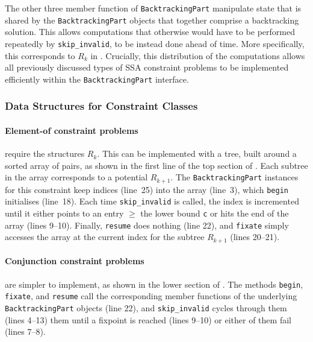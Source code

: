     The other three member function of \texttt{BacktrackingPart} manipulate
    state that is shared by the \texttt{BacktrackingPart} objects
    that together comprise a backtracking solution.
    This allows computations that otherwise would have to be performed
    repeatedly by \texttt{skip\_invalid}, to be instead done ahead
    of time.
    More specifically, this corresponds to $R_k$ in
    .
    Crucially, this distribution of the computations allows all previously
    discussed types of SSA constraint problems to be implemented efficiently
    within the {\tt BacktrackingPart} interface.

\subsubsection{Data Structures for Constraint Classes}

    \paragraph*{Element-of constraint problems} require the structures $R_k$.
    This can be implemented with a tree, built around a sorted array of pairs,
    as shown in the first line of the top section of .
    Each subtree in the array corresponds to a potential $R_{k+1}$.
    The {\tt BacktrackingPart} instances for this constraint keep indices
    (line~25) into
    the array (line~3), which {\tt begin} initialises (line~18).
    Each time {\tt skip\_invalid} is called, the index is incremented until
    it either points to an entry $\geq$ the lower bound {\tt c} or hits the
    end of the array (lines 9--10).
    Finally, {\tt resume} does nothing (line 22), and {\tt fixate} simply
    accesses the array at the current index for the subtree $R_{k+1}$
    (lines 20--21).

    \paragraph*{Conjunction constraint problems} are simpler to implement, as
    shown in the lower section of .
    The methods {\tt begin}, {\tt fixate}, and {\tt resume} call the
    corresponding member functions of the underlying {\tt BacktrackingPart}
    objects (line 22), and \texttt{skip\_invalid} cycles through them
    (lines 4--13) them until a fixpoint is reached (lines 9--10) or
    either of them fail (lines 7--8).

